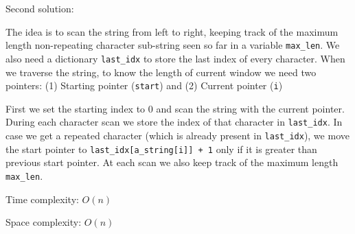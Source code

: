 \documentclass[a4paper,11pt]{book}
\begin{document}
\noindent Second solution: 

The idea is to scan the string from left to right, keeping track of the maximum length non-repeating character sub-string seen so far in a variable \lstinline{max_len}. We also need a dictionary \lstinline{last_idx} to store the last index of every character. When we traverse the string, to know the length of current window we need two pointers: (1) Starting pointer (\lstinline{start}) and (2) Current pointer (\lstinline{i})

First we set the starting index to 0 and scan the string with the current pointer. During each character scan we store the index of that character in \lstinline{last_idx}. In case we get a repeated character (which is already present in \lstinline{last_idx}), we move the start pointer to \lstinline{last_idx[a_string[i]] + 1} only if it is greater than previous start pointer. At each scan we also keep track of the maximum length \lstinline{max_len}.

\noindent Time complexity: $O(n)$

\noindent Space complexity: $O(n)$
\end{document}
